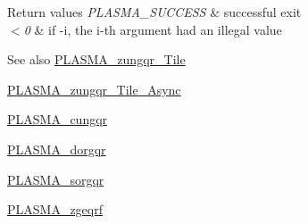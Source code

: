 \begin{DoxyRetVals}{Return values}
{\em P\+L\+A\+S\+M\+A\+\_\+\+S\+U\+C\+C\+E\+S\+S} & successful exit \\
\hline
{\em $<$0} & if -\/i, the i-\/th argument had an illegal value\\
\hline
\end{DoxyRetVals}
\begin{DoxySeeAlso}{See also}
\hyperlink{group__PLASMA__Complex64__t__Tile_ga95b4202db333c7547d3459d7b909fcd6_ga95b4202db333c7547d3459d7b909fcd6}{P\+L\+A\+S\+M\+A\+\_\+zungqr\+\_\+\+Tile} 

\hyperlink{group__PLASMA__Complex64__t__Tile__Async_gafc2a8fdc018edb78cfa3fb1e671e16f4_gafc2a8fdc018edb78cfa3fb1e671e16f4}{P\+L\+A\+S\+M\+A\+\_\+zungqr\+\_\+\+Tile\+\_\+\+Async} 

\hyperlink{group__PLASMA__Complex32__t_ga6c696165c8c276260ba80eff16e4d291_ga6c696165c8c276260ba80eff16e4d291}{P\+L\+A\+S\+M\+A\+\_\+cungqr} 

\hyperlink{group__double_ga5137c6e07ebf2faddae220daa28999ba_ga5137c6e07ebf2faddae220daa28999ba}{P\+L\+A\+S\+M\+A\+\_\+dorgqr} 

\hyperlink{group__float_ga4b6a6aa9e5da7961424f3afb62a69562_ga4b6a6aa9e5da7961424f3afb62a69562}{P\+L\+A\+S\+M\+A\+\_\+sorgqr} 

\hyperlink{group__PLASMA__Complex64__t_ga9d4fae8697b364c384faa7480aea3118_ga9d4fae8697b364c384faa7480aea3118}{P\+L\+A\+S\+M\+A\+\_\+zgeqrf} 
\end{DoxySeeAlso}
\hypertarget{group__PLASMA__Complex64__t_ga2c015740671fa101298fb9841b25f5d2_ga2c015740671fa101298fb9841b25f5d2}{}
